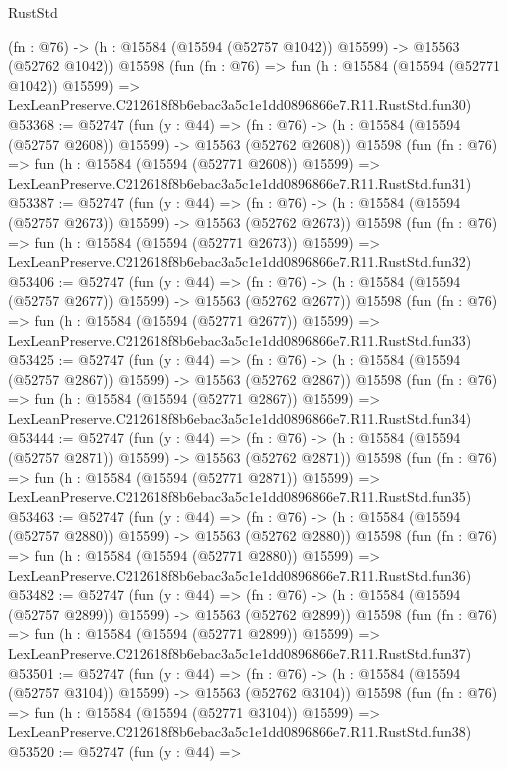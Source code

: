 \begin{lexlean}{RustStd}
\begin{coremodule}
    (fn : @76) -> (h : @15584 (@15594 (@52757 @1042)) @15599) -> @15563 (@52762 @1042))
    @15598
    (fun (fn : @76) =>
    fun (h : @15584 (@15594 (@52771 @1042)) @15599) =>
    LexLeanPreserve.C212618f8b6ebac3a5c1e1dd0896866e7.R11.RustStd.fun30)
@53368 := @52747
    (fun (y : @44) =>
    (fn : @76) -> (h : @15584 (@15594 (@52757 @2608)) @15599) -> @15563 (@52762 @2608))
    @15598
    (fun (fn : @76) =>
    fun (h : @15584 (@15594 (@52771 @2608)) @15599) =>
    LexLeanPreserve.C212618f8b6ebac3a5c1e1dd0896866e7.R11.RustStd.fun31)
@53387 := @52747
    (fun (y : @44) =>
    (fn : @76) -> (h : @15584 (@15594 (@52757 @2673)) @15599) -> @15563 (@52762 @2673))
    @15598
    (fun (fn : @76) =>
    fun (h : @15584 (@15594 (@52771 @2673)) @15599) =>
    LexLeanPreserve.C212618f8b6ebac3a5c1e1dd0896866e7.R11.RustStd.fun32)
@53406 := @52747
    (fun (y : @44) =>
    (fn : @76) -> (h : @15584 (@15594 (@52757 @2677)) @15599) -> @15563 (@52762 @2677))
    @15598
    (fun (fn : @76) =>
    fun (h : @15584 (@15594 (@52771 @2677)) @15599) =>
    LexLeanPreserve.C212618f8b6ebac3a5c1e1dd0896866e7.R11.RustStd.fun33)
@53425 := @52747
    (fun (y : @44) =>
    (fn : @76) -> (h : @15584 (@15594 (@52757 @2867)) @15599) -> @15563 (@52762 @2867))
    @15598
    (fun (fn : @76) =>
    fun (h : @15584 (@15594 (@52771 @2867)) @15599) =>
    LexLeanPreserve.C212618f8b6ebac3a5c1e1dd0896866e7.R11.RustStd.fun34)
@53444 := @52747
    (fun (y : @44) =>
    (fn : @76) -> (h : @15584 (@15594 (@52757 @2871)) @15599) -> @15563 (@52762 @2871))
    @15598
    (fun (fn : @76) =>
    fun (h : @15584 (@15594 (@52771 @2871)) @15599) =>
    LexLeanPreserve.C212618f8b6ebac3a5c1e1dd0896866e7.R11.RustStd.fun35)
@53463 := @52747
    (fun (y : @44) =>
    (fn : @76) -> (h : @15584 (@15594 (@52757 @2880)) @15599) -> @15563 (@52762 @2880))
    @15598
    (fun (fn : @76) =>
    fun (h : @15584 (@15594 (@52771 @2880)) @15599) =>
    LexLeanPreserve.C212618f8b6ebac3a5c1e1dd0896866e7.R11.RustStd.fun36)
@53482 := @52747
    (fun (y : @44) =>
    (fn : @76) -> (h : @15584 (@15594 (@52757 @2899)) @15599) -> @15563 (@52762 @2899))
    @15598
    (fun (fn : @76) =>
    fun (h : @15584 (@15594 (@52771 @2899)) @15599) =>
    LexLeanPreserve.C212618f8b6ebac3a5c1e1dd0896866e7.R11.RustStd.fun37)
@53501 := @52747
    (fun (y : @44) =>
    (fn : @76) -> (h : @15584 (@15594 (@52757 @3104)) @15599) -> @15563 (@52762 @3104))
    @15598
    (fun (fn : @76) =>
    fun (h : @15584 (@15594 (@52771 @3104)) @15599) =>
    LexLeanPreserve.C212618f8b6ebac3a5c1e1dd0896866e7.R11.RustStd.fun38)
@53520 := @52747
    (fun (y : @44) =>

\end{coremodule}
\end{lexlean}
